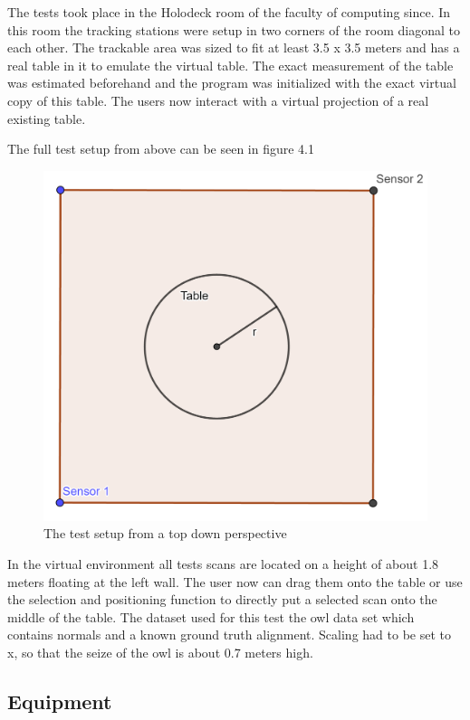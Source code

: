 \documentclass[hyperref,english,bachelorofscience,bibnum]{cgvpub}
\begin{document}
The tests took place in the Holodeck room of the faculty of computing since. In this room the tracking stations were setup in two corners of the room diagonal to each other. The trackable area was sized to fit at least 3.5 x 3.5 meters and has a real table in it to emulate the virtual table. The exact measurement of the table was estimated beforehand and the program was initialized with the exact virtual copy of this table. The users now interact with a virtual projection of a real existing table.

The full test setup from above can be seen in figure 4.1

\begin{figure}[htbp]
	\centering
		\includegraphics[width= \linewidth]{test_setup.png}
	\caption{The test setup from a top down perspective}
	\label{fig:test}
\end{figure}

In the virtual environment all tests scans are located on a height of about 1.8 meters floating at the left wall. The user now can drag them onto the table or use the selection and positioning function to directly put a selected scan onto the middle of the table.
The dataset used for this test the owl data set which contains normals and a known ground truth alignment. Scaling had to be set to x, so that the seize of the owl is about 0.7 meters high.

\subsection{Equipment}
\end{document}
